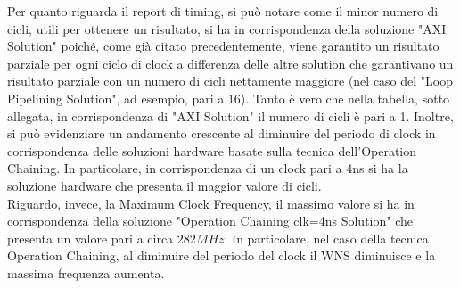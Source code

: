 Per quanto riguarda il report di timing, si può notare come il minor numero di cicli, utili per ottenere un risultato, si ha in corrispondenza della soluzione "AXI Solution" poiché, come già citato precedentemente, viene garantito un risultato parziale per ogni ciclo di clock a differenza delle altre solution che garantivano un risultato parziale con un numero di cicli nettamente maggiore (nel caso del "Loop Pipelining Solution", ad esempio, pari a 16). Tanto è vero che nella tabella, sotto allegata, in corrispondenza di "AXI Solution" il numero di cicli è pari a 1. Inoltre, si può evidenziare un andamento crescente al diminuire del periodo di clock in corrispondenza delle soluzioni hardware basate sulla tecnica dell'Operation Chaining. In particolare, in corrispondenza di un clock pari a 4ns si ha la soluzione hardware che presenta il maggior valore di cicli.
\\
Riguardo, invece, la Maximum Clock Frequency, il massimo valore si ha in corrispondenza della soluzione "Operation Chaining clk=4ns Solution" che presenta un valore pari a circa $282 MHz$. In particolare, nel caso della tecnica Operation Chaining, al diminuire del periodo del clock il WNS diminuisce e la massima frequenza aumenta.

